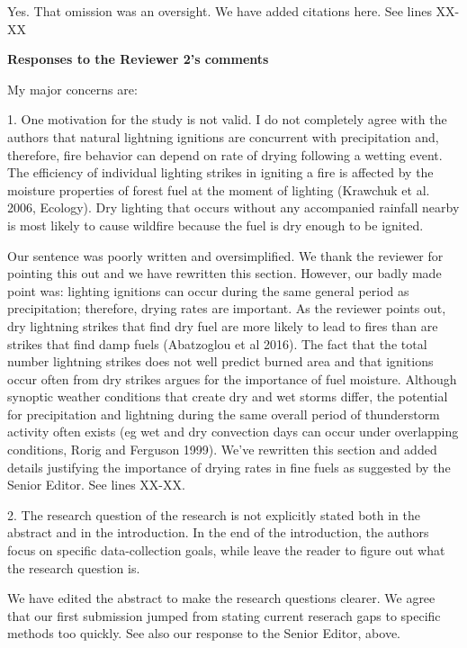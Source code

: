 \documentclass[letterpaper, 12pt]{letter}
\begin{document}
\begin{letter}{}
Yes. That omission was an oversight. We have added citations here. See lines
XX-XX

{\bf Responses to the Reviewer 2's comments}

\begin{quoting}

  My major concerns are:
  
  1. One motivation for the study is not valid. I do not completely agree with
  the authors that natural lightning ignitions are concurrent with
  precipitation and, therefore, fire behavior can depend on rate of drying
  following a wetting event. The efficiency of individual lighting strikes in
  igniting a fire is affected by the moisture properties of forest fuel at the
  moment of lighting (Krawchuk et al. 2006, Ecology). Dry lighting that occurs
  without any accompanied rainfall nearby is most likely to cause wildfire
  because the fuel is dry enough to be ignited.
\end{quoting}

Our sentence was poorly written and oversimplified. We thank the reviewer for
pointing this out and we have rewritten this section. However, our badly made
point was: lighting ignitions can occur during the same general period as
precipitation; therefore, drying rates are important. As the reviewer points
out, dry lightning strikes that find dry fuel are more likely to lead to fires
than are strikes that find damp fuels (Abatzoglou et al 2016). The fact that
the total number lightning strikes does not well predict burned area and that
ignitions occur often from dry strikes argues for the importance of fuel
moisture. Although synoptic weather conditions that create dry and wet storms
differ, the potential for precipitation and lightning during the same overall
period of thunderstorm activity often exists (eg wet and dry convection days
can occur under overlapping conditions, Rorig and Ferguson 1999). We've
rewritten this section and added details justifying the importance of drying
rates in fine fuels as suggested by the Senior Editor. See lines XX-XX.

\begin{quoting}
  2. The research question of the research is not explicitly stated both in the
  abstract and in the introduction. In the end of the introduction, the authors
  focus on specific data-collection goals, while leave the reader to figure out
  what the research question is.
\end{quoting}

We have edited the abstract to make the research questions clearer. We agree
that our first submission jumped from stating current reserach gaps to specific
methods too quickly. See also our response to the Senior Editor, above.



\end{letter}
\end{document}
